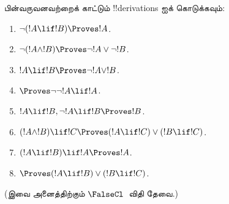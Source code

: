 \documentclass[../../../include/open-logic-section]{subfiles}
\begin{document}
\begin{prob}
பின்வருவனவற்றைக் காட்டும் !!{derivation}s ஐக் கொடுக்கவும்:
\begin{enumerate}
\item $\lnot(!A \lif !B) \Proves !A$.
\item $\lnot(!A \land !B) \Proves \lnot !A \lor \lnot !B$.
\item $!A \lif !B \Proves \lnot !A \lor !B$.
\item $\Proves \lnot \lnot !A \lif !A$.
\item $!A \lif !B, \lnot !A \lif !B \Proves !B$.
\item $(!A \land !B) \lif !C \Proves (!A \lif !C) \lor (!B \lif !C)$.
\item $(!A \lif !B) \lif !A \Proves !A$.
\item $\Proves (!A \lif !B) \lor (!B \lif !C)$.
\end{enumerate}
(இவை அனைத்திற்கும் $\FalseCl$~விதி தேவை.)
\end{prob}
\end{document}

